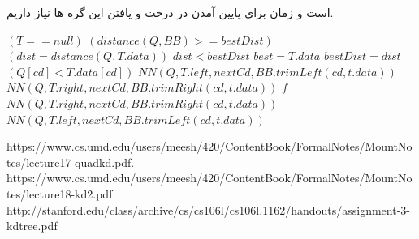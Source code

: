 \documentclass[11pt]{article}
\begin{document}
است و زمان 
برای پایین آمدن در درخت و یافتن این گره ها نیاز داریم.
\begin{latin}
\begin{codebox}
\li \If $(T == null)$ \Return 
\li \If $(distance(Q, BB) >= bestDist)$
\li \Do \Return 
\End
\li $(dist = distance(Q, T.data))$
\li \If $dist < bestDist$
\li \Do $best = T.data$
\li $bestDist = dist$
\End
\li \If $(Q[cd] < T.data[cd])$
\li \Do $NN(Q, T.left, nextCd, BB.trimLeft(cd, t.data))$
\li $NN(Q, T.right, nextCd, BB.trimRight(cd, t.data))$
\li $f$
\Else 
\li $NN(Q, T.right, nextCd, BB.trimRight(cd, t.data))$
\li $NN(Q, T.left, nextCd, BB.trimLeft(cd, t.data))$
\End
\End
\End
\end{codebox}
\end{latin}



\begin{thebibliography}{99}
	\begin{latin}	%
		
		https://www.cs.umd.edu/users/meesh/420/ContentBook/FormalNotes/MountNotes/lecture17-quadkd.pdf.
		https://www.cs.umd.edu/users/meesh/420/ContentBook/FormalNotes/MountNotes/lecture18-kd2.pdf
		http://stanford.edu/class/archive/cs/cs106l/cs106l.1162/handouts/assignment-3-kdtree.pdf
	\end{latin}	
\end{thebibliography}
\end{document}
